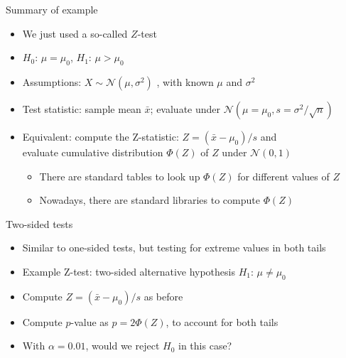 	\begin{frame}[c]{Summary of example}
		
		\begin{itemize}
			\item We just used a so-called \alert{$Z$-test}
			\item $H_0$: $\mu=\mu_0$, $H_1$: $\mu>\mu_0$  
			\item Assumptions: $X \sim \mathcal{N}(\mu,\sigma^2)$ , with known $\mu$ and $\sigma^2$
			
			\medskip
			\pause
			\item \alert{Test statistic}: sample mean $\bar{x}$; evaluate under 
			$\mathcal{N}(\mu=\mu_0,s=\sigma^2/\sqrt{n})$
			\pause
			\smallskip
			\item Equivalent: compute the \alert{Z-statistic}: $Z = (\bar{x}-\mu_0)/s$
			and\\
			evaluate cumulative distribution $\Phi(Z)$ of $Z$
			under $\mathcal{N}(0,1)$
			\medskip
			\pause
			\begin{itemize}
				\item There are standard tables to look up $\Phi(Z)$ for different values of $Z$
				\item Nowadays, there are standard libraries to compute $\Phi(Z)$
			\end{itemize}
			
		\end{itemize}
		
	\end{frame}
	\begin{frame}[c]{Two-sided tests}
		
		
		\vspace*{-0.2cm}
		\begin{center}
			
		\end{center}
		\vspace*{-0.2cm}
		
		\begin{itemize}
			\item Similar to one-sided tests, but testing for extreme values in both tails
			\item Example Z-test: two-sided alternative hypothesis $H_1$:
			$\mu \neq \mu_0$
			\pause
			\smallskip
			\item Compute $Z = (\bar{x}-\mu_0)/s$ as before
			\item Compute $p$-value as $p = 2\Phi(Z)$, to account for both tails
			\pause 
			\medskip
			\item With $\alpha = 0.01$, would we reject $H_0$ in this case? 
		\end{itemize}
		
	\end{frame}
